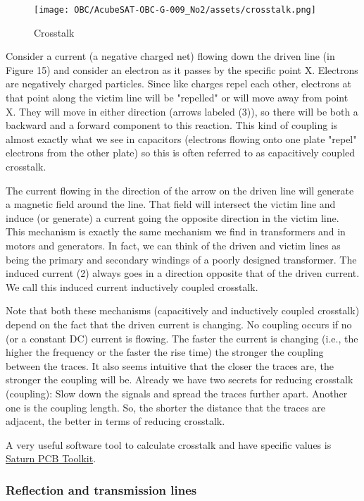 \documentclass[final]{cubedoc}
\begin{document}
	\begin{figure}[h!]
		\centering
		\texttt{[image: OBC/AcubeSAT-OBC-G-009\_No2/assets/crosstalk.png]}
		\caption{Crosstalk}
		\label{fig:my_label}
	\end{figure}
	
	Consider a current (a negative charged net) flowing down the driven line (in Figure 15) and consider an electron as it passes by the specific point X. Electrons are negatively charged particles. Since like charges repel each other, electrons at that point along the victim line will be "repelled" or will move away from point X. They will move in either direction (arrows labeled (3)), so there will be both a backward and a forward component to this reaction. This kind of coupling is almost exactly what we see in capacitors (electrons flowing onto one plate "repel" electrons from the other plate) so this is often referred to as capacitively coupled crosstalk.
	
	The current flowing in the direction of the arrow on the driven line will generate a magnetic field around the line. That field will intersect the victim line and induce (or generate) a current going the opposite direction in the victim line. This mechanism is exactly the same mechanism we find in transformers and in motors and generators. In fact, we can think of the driven and victim lines as being the primary and secondary windings of a poorly designed transformer. The induced current (2) always goes in a direction opposite that of the driven current. We call this induced current inductively coupled crosstalk.
	
	Note that both these mechanisms (capacitively and inductively coupled crosstalk) depend on the fact that the driven current is changing. No coupling occurs if no (or a constant DC) current is flowing. The faster the current is changing (i.e., the higher the frequency or the faster the rise time) the stronger the coupling between the traces. It also seems intuitive that the closer the traces are, the stronger the coupling will be. Already we have two secrets for reducing crosstalk (coupling): Slow down the signals and spread the traces further apart. Another one is the coupling length. So, the shorter the distance that the traces are adjacent, the better in terms of reducing crosstalk. 
	
	A very useful software tool to calculate crosstalk and have specific values is \href{http://www.saturnpcb.com/pcb_toolkit/}{Saturn PCB Toolkit}.
	
	\subsubsection{Reflection and transmission lines}
	
\end{document}
